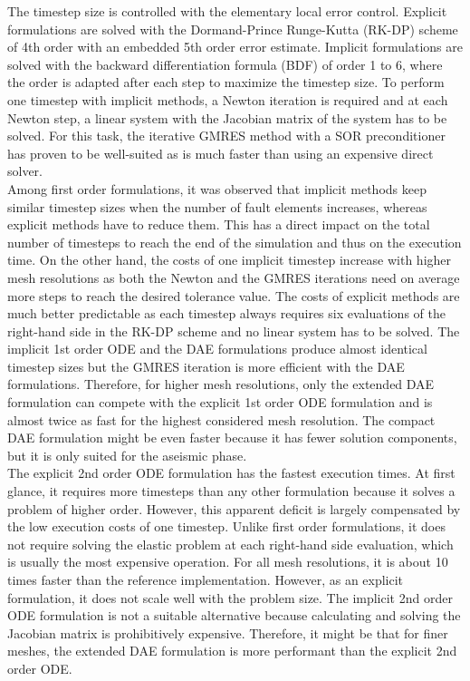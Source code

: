 The timestep size is controlled with the elementary local error control. Explicit formulations are solved with the Dormand-Prince Runge-Kutta (RK-DP) scheme of 4th order with an embedded 5th order error estimate. Implicit formulations are solved with the backward differentiation formula (BDF) of order 1 to 6, where the order is adapted after each step to maximize the timestep size. To perform one timestep with implicit methods, a Newton iteration is required and at each Newton step, a linear system with the Jacobian matrix of the system has to be solved. For this task, the iterative GMRES method with a SOR preconditioner has proven to be well-suited as is much faster than using an expensive direct solver.  \\

Among first order formulations, it was observed that implicit methods keep similar timestep sizes when the number of fault elements increases, whereas explicit methods have to reduce them. This has a direct impact on the total number of timesteps to reach the end of the simulation and thus on the execution time. On the other hand, the costs of one implicit timestep increase with higher mesh resolutions as both the Newton and the GMRES iterations need on average more steps to reach the desired tolerance value. The costs of explicit methods are much better predictable as each timestep always requires six evaluations of the right-hand side in the RK-DP scheme and no linear system has to be solved. The implicit 1st order ODE and the DAE formulations produce almost identical timestep sizes but the GMRES iteration is more efficient with the DAE formulations. Therefore, for higher mesh resolutions, only the extended DAE formulation can compete with the explicit 1st order ODE formulation and is almost twice as fast for the highest considered mesh resolution. The compact DAE formulation might be even faster because it has fewer solution components, but it is only suited for the aseismic phase. \\

The explicit 2nd order ODE formulation has the fastest execution times. At first glance, it requires more timesteps than any other formulation because it solves a problem of higher order. However, this apparent deficit is largely compensated by the low execution costs of one timestep. Unlike first order formulations, it does not require solving the elastic problem at each right-hand side evaluation, which is usually the most expensive operation. For all mesh resolutions, it is about 10 times faster than the reference implementation. However, as an explicit formulation, it does not scale well with the problem size. The implicit 2nd order ODE formulation is not a suitable alternative because calculating and solving the Jacobian matrix is prohibitively expensive. Therefore, it might be that for finer meshes, the extended DAE formulation is more performant than the explicit 2nd order ODE. \\

